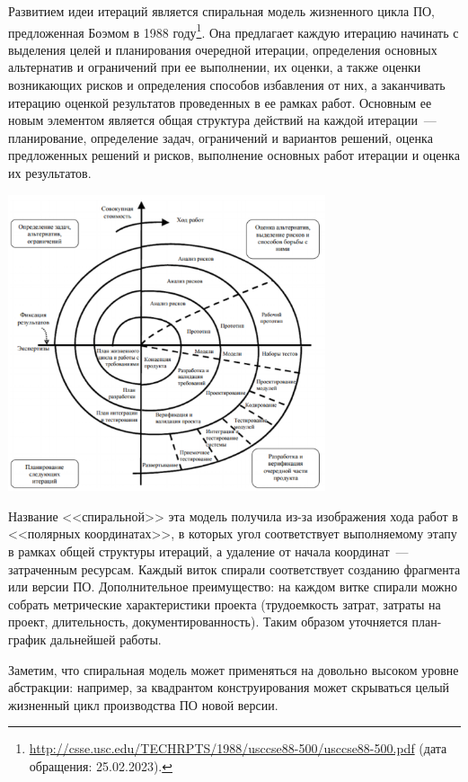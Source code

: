 \documentclass{../../text-style}
\begin{document}
Развитием идеи итераций является спиральная модель жизненного цикла ПО, предложенная Боэмом в 1988 году\footnote{\url{http://csse.usc.edu/TECHRPTS/1988/usccse88-500/usccse88-500.pdf} (дата обращения: 25.02.2023).}. Она предлагает каждую итерацию начинать с выделения целей и планирования очередной итерации, определения основных альтернатив и ограничений при ее выполнении, их оценки, а также оценки возникающих рисков и определения способов избавления от них, а заканчивать итерацию оценкой результатов проведенных в ее рамках работ. Основным ее новым элементом является общая структура действий на каждой итерации~--- планирование, определение задач, ограничений и вариантов решений, оценка предложенных решений и рисков, выполнение основных работ итерации и оценка их результатов.

\begin{center}
    \includegraphics[width=0.7\textwidth]{spiralModel.png}
\end{center}

Название <<спиральной>> эта модель получила из-за изображения хода работ в <<полярных координатах>>, в которых угол соответствует выполняемому этапу в рамках общей структуры итераций, а удаление от начала координат~--- затраченным ресурсам. Каждый виток спирали соответствует созданию фрагмента или версии ПО. Дополнительное преимущество: на каждом витке спирали можно собрать метрические характеристики проекта (трудоемкость затрат, затраты на проект, длительность, документированность). Таким образом уточняется план-график дальнейшей работы.

Заметим, что спиральная модель может применяться на довольно высоком уровне абстракции: например, за квадрантом конструирования может скрываться целый жизненный цикл производства ПО новой версии.
\end{document}
